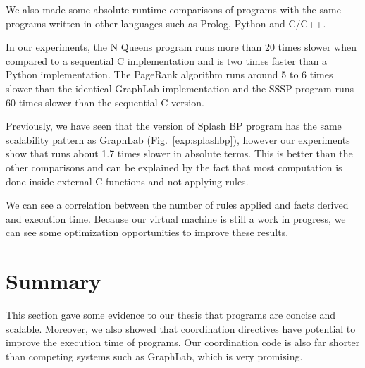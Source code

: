 We also made some absolute runtime comparisons of \lang programs with the same programs written in
other languages such as Prolog, Python and C/C++.

In our experiments, the N Queens program runs more than 20 times slower when compared to a sequential C implementation and is two times faster than a Python
implementation. The PageRank algorithm runs around 5 to 6 times slower than the identical GraphLab
implementation and the SSSP program runs 60 times slower than the sequential C version.

Previously, we have seen that the \lang version of Splash BP program has the same scalability pattern
as GraphLab (Fig.~\ref{exp:splashbp}), however our experiments show that \lang runs about 1.7 times slower in absolute terms.
This is better than the other comparisons and can be explained by the fact
that most computation is done inside external C functions and not applying rules.

We can see a correlation between the number of rules applied and facts derived and execution time.
Because our virtual machine is still a work in progress, we can see some optimization opportunities
to improve these results.

\section{Summary}

This section gave some evidence to our thesis that \lang programs are concise and scalable. Moreover, we
also showed that coordination directives have potential to improve the execution time
of programs. Our coordination code is also far shorter than competing systems such as GraphLab, which is
very promising.
